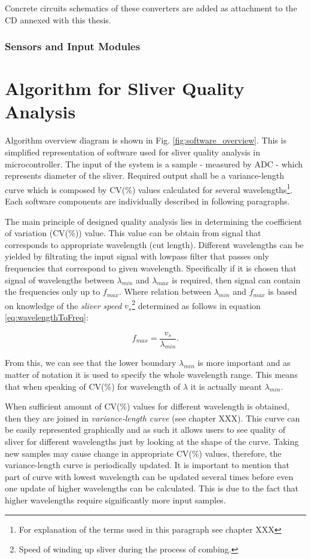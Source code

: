 \documentclass[twoside]{ctuthesis}
\theoremstyle{plain}
\theoremstyle{definition}
\theoremstyle{note}
\begin{document}
Concrete circuits schematics of these converters are added as attachment to the CD annexed with this thesis.

\subsubsection{Sensors and Input Modules}



\section{Algorithm for Sliver Quality Analysis}
Algorithm overview diagram is shown in Fig. \ref{fig:software_overview}. This is simplified representation of software used for sliver quality analysis in microcontroller. The input of the system is a sample - measured by ADC - which represents diameter of the sliver. Required output shall be a variance-length curve which is composed by CV(\%) values calculated for several wavelengths\footnote{\label{footnote1:textileTerms}For explanation of the terms used in this paragraph see chapter XXX}. Each software components are individually described in following paragraphs.

The main principle of designed quality analysis lies in determining the coefficient of variation (CV(\%)) value. This value can be obtain from signal that corresponds to appropriate wavelength (cut length). Different wavelengths can be yielded by filtrating the input signal with lowpass filter that passes only frequencies that correspond to given wavelength. Specifically if it is chosen that signal of wavelengths between $\lambda_{min}$ and $\lambda_{max}$ is required, then signal can contain the frequencies only up to $f_{max}$. Where relation between $\lambda_{min}$ and $f_{max}$ is based on knowledge of the \textit{sliver speed} $v_{s}$\footnote{Speed of winding up sliver during the process of combing.} determined as follows in equation \ref{eq:wavelengthToFreq}:

\begin{equation} \label{eq:wavelengthToFreq}
f_{max} = \frac{v_{s}}{\lambda_{min}}.
\end{equation}

From this, we can see that the lower boundary $\lambda_{min}$ is more important and as matter of notation it is used to specify the whole wavelength range. This means that when speaking of CV(\%) for wavelength of $\lambda$ it is actually meant $\lambda_{min}$.

When sufficient amount of CV(\%) values for different wavelength is obtained, then they are joined in \textit{variance-length curve} (see chapter XXX). This curve can be easily represented graphically and as such it allows users to see quality of sliver for different wavelengths just by looking at the shape of the curve. Taking new samples may cause change in appropriate CV(\%) values, therefore, the variance-length curve is periodically updated. It is important to mention that part of curve with lowest wavelength can be updated several times before even one update of higher wavelengths can be calculated. This is due to the fact that higher wavelengths require significantly more input samples.
\end{document}
